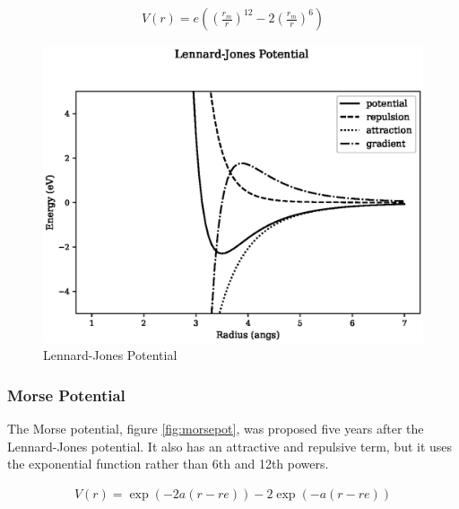\begin{equation}
\begin{split}
V(r) = e \left(\left(\frac{r_m}{r}\right)^{12} - 2 \left(\frac{r_m}{r}\right)^6\right)
\end{split}
\label{eq:eqLennardJones}
\end{equation}

\begin{figure}[!htbp]
  \begin{center}
    \includegraphics[width=.6\linewidth]{chapters/interatomic_potential_fitting/plots_pair_potentials/lennard_jones.eps}
    \caption{Lennard-Jones Potential}
    \label{fig:lennardjonespot}
  \end{center}
\end{figure}



\FloatBarrier
\subsubsection{Morse Potential}
\label{section:Morse}

The Morse potential, figure \ref{fig:morsepot}, was proposed five years after the Lennard-Jones potential.  It also has an attractive and repulsive term, but it uses the exponential function rather than 6th and 12th powers.

\begin{equation}
\begin{split}
V(r) = \exp(-2 a (r - re)) - 2 \exp (-a(r - re))
\end{split}
\label{eq:eqLennardJones}
\end{equation}

